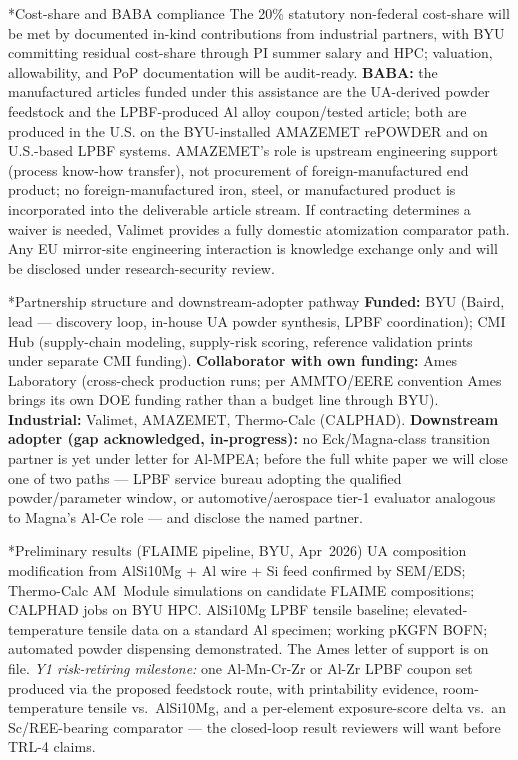 \documentclass[10pt]{article}
\makeatletter
\renewcommand{\section}{\@startsection{section}{1}{0pt}{0.4ex plus 0.1ex}{0.15ex}{\normalfont\bfseries}}
\makeatother
\begin{document}
\section*{Cost-share and BABA compliance}
The 20\% statutory non-federal cost-share will be met by documented in-kind contributions from industrial partners, with BYU committing residual cost-share through PI summer salary and HPC; valuation, allowability, and PoP documentation will be audit-ready. \textbf{BABA:} the manufactured articles funded under this assistance are the UA-derived powder feedstock and the LPBF-produced Al alloy coupon/tested article; both are produced in the U.S. on the BYU-installed AMAZEMET rePOWDER and on U.S.-based LPBF systems. AMAZEMET's role is upstream engineering support (process know-how transfer), not procurement of foreign-manufactured end product; no foreign-manufactured iron, steel, or manufactured product is incorporated into the deliverable article stream. If contracting determines a waiver is needed, Valimet provides a fully domestic atomization comparator path. Any EU mirror-site engineering interaction is knowledge exchange only and will be disclosed under research-security review.

\section*{Partnership structure and downstream-adopter pathway}
\textbf{Funded:} BYU (Baird, lead --- discovery loop, in-house UA powder synthesis, LPBF coordination); CMI Hub (supply-chain modeling, supply-risk scoring, reference validation prints under separate CMI funding). \textbf{Collaborator with own funding:} Ames Laboratory (cross-check production runs; per AMMTO/EERE convention Ames brings its own DOE funding rather than a budget line through BYU). \textbf{Industrial:} Valimet, AMAZEMET, Thermo-Calc (CALPHAD). \textbf{Downstream adopter (gap acknowledged, in-progress):} no Eck/Magna-class transition partner is yet under letter for Al-MPEA; before the full white paper we will close one of two paths --- LPBF service bureau adopting the qualified powder/parameter window, or automotive/aerospace tier-1 evaluator analogous to Magna's Al-Ce role --- and disclose the named partner.

\section*{Preliminary results (FLAIME pipeline, BYU, Apr~2026)}
UA composition modification from AlSi10Mg + Al wire + Si feed confirmed by SEM/EDS; Thermo-Calc AM~Module simulations on candidate FLAIME compositions; CALPHAD jobs on BYU HPC. AlSi10Mg LPBF tensile baseline; elevated-temperature tensile data on a standard Al specimen; working pKGFN BOFN; automated powder dispensing demonstrated. The Ames letter of support is on file. \emph{Y1 risk-retiring milestone:} one Al-Mn-Cr-Zr or Al-Zr LPBF coupon set produced via the proposed feedstock route, with printability evidence, room-temperature tensile vs.~AlSi10Mg, and a per-element exposure-score delta vs.~an Sc/REE-bearing comparator --- the closed-loop result reviewers will want before TRL-4 claims.
\end{document}
